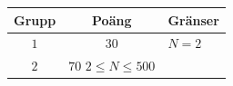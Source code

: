 
\begin{center}
\begin{tabular}{| c | c | l |}
  \hline
  \textbf{Grupp} & \textbf{Poäng} & \textbf{Gränser} \\ \hline
  $1$    & $30$  & $N = 2$ \\ \hline
  $2$    & $70$  $2 \leq N \leq 500$ \\ \hline
\end{tabular}
\end{center}

